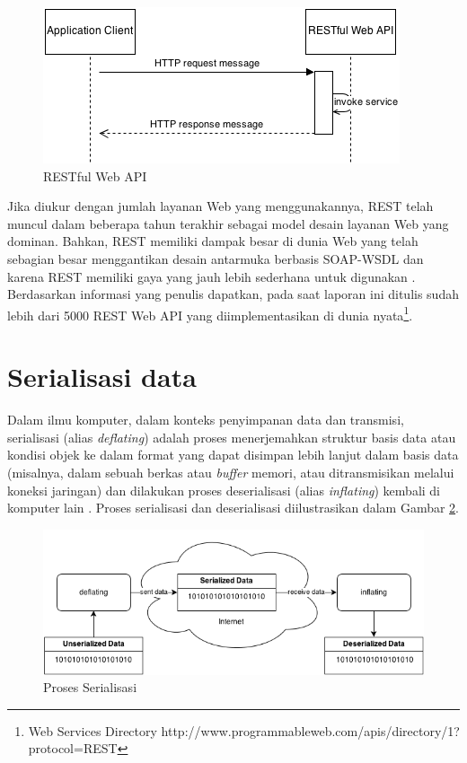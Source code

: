 \documentclass[a4paper, 12pt, oneside]{report}
\begin{document}
\onehalfspacing
\begin{figure}[htp]
\centering
\includegraphics[scale=1.00]{images/RESTful-web-api.png}
\caption{RESTful Web API}
\label{RESTful Web API}
\end{figure}

\onehalfspacing Jika diukur dengan jumlah layanan Web yang menggunakannya, REST telah muncul dalam beberapa tahun terakhir sebagai model desain layanan Web yang dominan. Bahkan, REST memiliki dampak besar di dunia Web yang telah sebagian besar menggantikan desain antarmuka berbasis SOAP-WSDL dan karena REST memiliki gaya yang jauh lebih sederhana untuk digunakan \cite{ws-restful}. Berdasarkan informasi yang penulis dapatkan, pada saat laporan ini ditulis sudah lebih dari 5000 REST Web API yang diimplementasikan di dunia nyata\footnote{Web Services Directory http://www.programmableweb.com/apis/directory/1?protocol=REST}.

\section{Serialisasi data}

\onehalfspacing Dalam ilmu komputer, dalam konteks penyimpanan data dan transmisi, serialisasi (alias \textit{deflating}) adalah proses menerjemahkan struktur basis data atau kondisi objek ke dalam format yang dapat disimpan lebih lanjut dalam basis data (misalnya, dalam sebuah berkas atau \textit{buffer} memori, atau ditransmisikan melalui koneksi jaringan) dan dilakukan proses deserialisasi (alias \textit{inflating}) kembali di komputer lain \cite{serialization-wikipedia}. Proses serialisasi dan deserialisasi diilustrasikan dalam Gambar \ref{Proses Serialisasi}.

\onehalfspacing 
\begin{figure}[htp]
\centering
\includegraphics[scale=0.65]{images/serialization-process.png}
\caption{Proses Serialisasi}
\label{Proses Serialisasi}
\end{figure}
\end{document}
